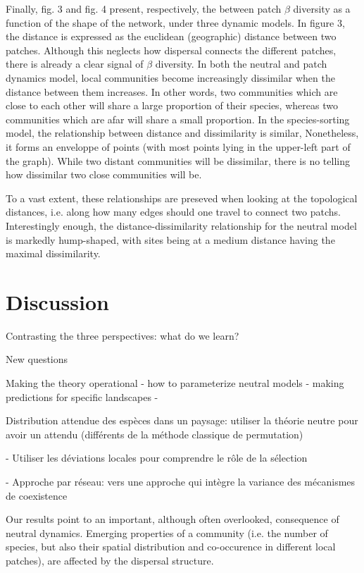 \documentclass[12pt]{article}
\begin{document}
Finally, fig. 3 and fig. 4 present, respectively, the between patch $\beta$
diversity as a function of the shape of the network, under three dynamic models.
In figure 3, the distance is expressed as the euclidean (geographic) distance
between two patches. Although this neglects how dispersal connects the different
patches, there is already a clear signal of $\beta$ diversity. In both the
neutral and patch dynamics model, local communities become increasingly
dissimilar when the distance between them increases. In other words, two
communities which are close to each other will share a large proportion of their
species, whereas two communities which are afar will share a small proportion.
In the species-sorting model, the relationship between distance and
dissimilarity is similar, Nonetheless, it forms an enveloppe of points (with
most points lying in the upper-left part of the graph). While two distant
communities will be dissimilar, there is no telling how dissimilar two close
communities will be.

To a vast extent, these relationships are preseved when looking at the
topological distances, i.e. along how many edges should one travel to connect
two patchs. Interestingly enough, the distance-dissimilarity relationship for
the neutral model is markedly hump-shaped, with sites being at a medium distance
having the maximal dissimilarity.

\section{Discussion}

Contrasting the three perspectives: what do we learn?

New questions

Making the theory operational
	- how to parameterize neutral models
	- making predictions for specific landscapes
	- 


Distribution attendue des espèces dans un paysage: utiliser la théorie neutre pour avoir un attendu (différents de la méthode classique de permutation)

- Utiliser les déviations locales pour comprendre le rôle de la sélection 

- Approche par réseau: vers une approche qui intègre la variance des mécanismes de coexistence

Our results point to an important, although often overlooked, consequence of
neutral dynamics. Emerging properties of a community (i.e. the number of
species, but also their spatial distribution and co-occurence in different local
patches), are affected by the dispersal structure. 
\end{document}
